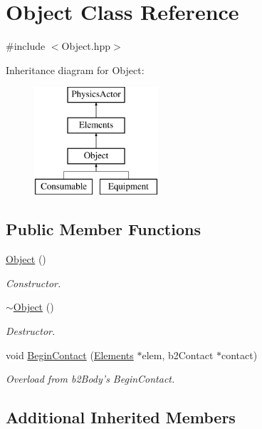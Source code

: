 \hypertarget{class_object}{\section{Object Class Reference}
\label{class_object}
}


{\ttfamily \#include $<$Object.\+hpp$>$}

Inheritance diagram for Object\+:\begin{figure}[H]
\begin{center}
\leavevmode
\includegraphics[height=4.000000cm]{class_object}
\end{center}
\end{figure}
\subsection*{Public Member Functions}
\begin{DoxyCompactItemize}
\item 
\hyperlink{class_object_a40860402e64d8008fb42329df7097cdb}{Object} ()
\begin{DoxyCompactList}\small\item\em Constructor. \end{DoxyCompactList}\item 
\hyperlink{class_object_ae8f5483f459e46687bd01e6f9977afd3}{$\sim$\+Object} ()
\begin{DoxyCompactList}\small\item\em Destructor. \end{DoxyCompactList}\item 
void \hyperlink{class_object_a5681745b50d64994e00fe519bbb4cd31}{Begin\+Contact} (\hyperlink{class_elements}{Elements} $\ast$elem, b2\+Contact $\ast$contact)
\begin{DoxyCompactList}\small\item\em Overload from b2\+Body's Begin\+Contact. \end{DoxyCompactList}\end{DoxyCompactItemize}
\subsection*{Additional Inherited Members}



